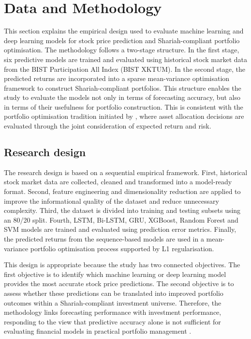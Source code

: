 \section{Data and Methodology}

This section explains the empirical design used to evaluate machine learning and deep learning models for stock price prediction and Shariah-compliant portfolio optimisation. The methodology follows a two-stage structure. In the first stage, six predictive models are trained and evaluated using historical stock market data from the BIST Participation All Index (BIST XKTUM). In the second stage, the predicted returns are incorporated into a sparse mean-variance optimisation framework to construct Shariah-compliant portfolios. This structure enables the study to evaluate the models not only in terms of forecasting accuracy, but also in terms of their usefulness for portfolio construction. This is consistent with the portfolio optimisation tradition initiated by \citet{markowitz1952portfolio}, where asset allocation decisions are evaluated through the joint consideration of expected return and risk.

\subsection{Research design}

The research design is based on a sequential empirical framework. First, historical stock market data are collected, cleaned and transformed into a model-ready format. Second, feature engineering and dimensionality reduction are applied to improve the informational quality of the dataset and reduce unnecessary complexity. Third, the dataset is divided into training and testing subsets using an 80/20 split. Fourth, LSTM, Bi-LSTM, GRU, XGBoost, Random Forest and SVM models are trained and evaluated using prediction error metrics. Finally, the predicted returns from the sequence-based models are used in a mean-variance portfolio optimisation process supported by L1 regularisation.

This design is appropriate because the study has two connected objectives. The first objective is to identify which machine learning or deep learning model provides the most accurate stock price predictions. The second objective is to assess whether these predictions can be translated into improved portfolio outcomes within a Shariah-compliant investment universe. Therefore, the methodology links forecasting performance with investment performance, responding to the view that predictive accuracy alone is not sufficient for evaluating financial models in practical portfolio management \citep{bodie2014investments}.

